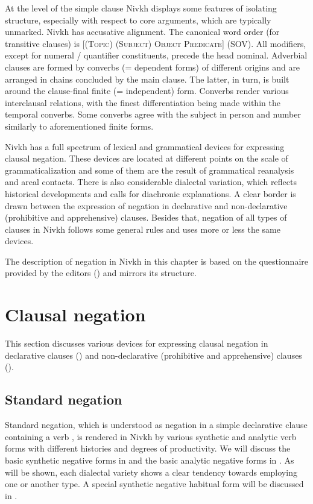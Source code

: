 \documentclass[output=paper,colorlinks,citecolor=brown]{langscibook}
\begin{document}
At the level of the simple clause Nivkh displays some features of isolating structure, especially with respect to core arguments, which are typically unmarked. Nivkh has accusative alignment. The canonical word order (for transitive clauses) is \textsc{[(Topic)} \textsc{(Subject)} \textsc{Object} \textsc{Predicate}] (SOV). All modifiers, except for numeral / quantifier constituents, precede the head nominal. Adverbial clauses are formed by converbs (= dependent forms) of different origins and are arranged in chains concluded by the main clause. The latter, in turn, is built around the clause-final finite (= independent) form. Converbs render various interclausal relations, with the finest differentiation being made within the temporal converbs. Some converbs agree with the subject in person and number similarly to aforementioned finite forms.

Nivkh has a full spectrum of lexical and grammatical devices for expressing clausal negation. These devices are located at different points on the scale of grammaticalization and some of them are the result of grammatical reanalysis and areal contacts. There is also considerable dialectal variation, which reflects historical developments and calls for diachronic explanations. A clear border is drawn between the expression of negation in declarative and non-declarative (prohibitive and apprehensive) clauses. Besides that, negation of all types of clauses in Nivkh follows some general rules and uses more or less the same devices.

\largerpage
The description of negation in Nivkh in this chapter is based on the questionnaire provided by the editors () and mirrors its structure.


\section{Clausal negation}\label{sec:niv:2} 

This section discusses various devices for expressing clausal negation in declarative clauses () and non-declarative (prohibitive and apprehensive) clauses ().

\subsection{Standard negation}\label{sec:niv:2.1} 

Standard negation, which is understood as negation in a simple declarative clause containing a verb \citep{Miestamo2005}, is rendered in Nivkh by various synthetic and analytic verb forms with different histories and degrees of productivity. We will discuss the basic synthetic negative forms in  and the basic analytic negative forms in . As will be shown, each dialectal variety shows a clear tendency towards employing one or another type.
A special synthetic negative habitual form will be discussed in .
\end{document}
